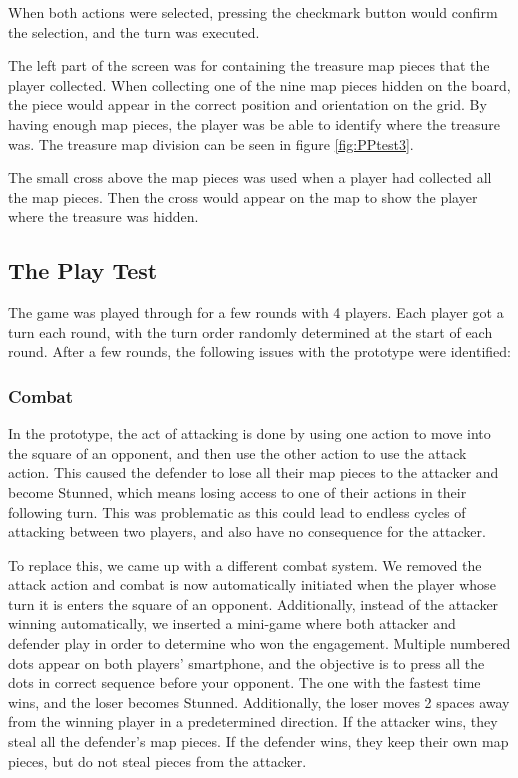 When both actions were selected, pressing the checkmark button would confirm the selection, and the turn was executed.

The left part of the screen was for containing the treasure map pieces that the player collected. When collecting one of the nine map pieces hidden on the board, the piece would appear in the correct position and orientation on the grid. By having enough map pieces, the player was be able to identify where the treasure was. The treasure map division can be seen in figure \ref{fig:PPtest3}.

The small cross above the map pieces was used when a player had collected all the map pieces. Then the cross would appear on the map to show the player where the treasure was hidden.

\subsection{The Play Test}
The game was played through for a few rounds with 4 players. Each player got a turn each round, with the turn order randomly determined at the start of each round.  After a few rounds, the following issues with the prototype were identified:

\subsubsection{Combat}
In the prototype, the act of attacking is done by using one action to move into the square of an opponent, and then use the other action to use the attack action. This caused the defender to lose all their map pieces to the attacker and become Stunned, which means losing access to one of their actions in their following turn. This was problematic as this could lead to endless cycles of attacking between two players, and also have no consequence for the attacker.

To replace this, we came up with a different combat system. We removed the attack action and combat is now automatically initiated when the player whose turn it is enters the square of an opponent. Additionally, instead of the attacker winning automatically, we inserted a mini-game where both attacker and defender play in order to determine who won the engagement. Multiple numbered dots appear on both players’ smartphone, and the objective is to press all the dots in correct sequence before your opponent. The one with the fastest time wins, and the loser becomes Stunned. Additionally, the loser moves 2 spaces away from the winning player in a predetermined direction. If the attacker wins, they steal all the defender’s map pieces. If the defender wins, they keep their own map pieces, but do not steal pieces from the attacker.

